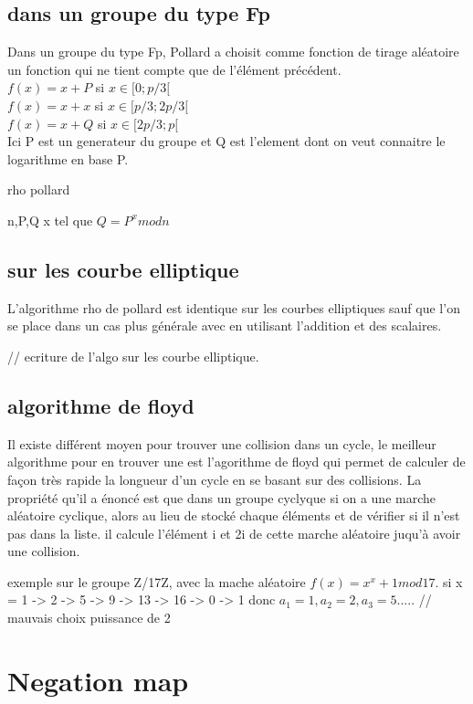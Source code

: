 \documentclass[a4paper,10pt]{report}
\begin{document}
\section{dans un groupe du type Fp}
Dans un groupe du type Fp, Pollard a choisit comme fonction de tirage aléatoire un fonction qui ne tient compte que de l'élément précédent.\\
$ f(x) = x+P$ si $x \in [0;p/3[$\\
$ f(x) = x+x$ si $x \in [p/3;2p/3[$\\
$ f(x) = x+Q$ si $x \in [2p/3;p[$\\
Ici P est un generateur du groupe et Q est l'element dont on veut connaitre le logarithme en base P.
{
\begin{algorithm}
\caption{rho pollard}
\begin{algorithmic}
 \REQUIRE n,P,Q
 \ENSURE x tel que $Q = P^x mod n$
\end{algorithmic}
\end{algorithm}


\section{sur les courbe elliptique}
L'algorithme rho de pollard est identique sur les courbes elliptiques sauf que l'on se place dans un cas plus générale
avec en utilisant l'addition et des scalaires.

// ecriture de l'algo sur les courbe elliptique.

\section{algorithme de floyd}
Il existe différent moyen pour trouver une collision dans un cycle, le meilleur algorithme pour en trouver
une est l'agorithme de floyd qui permet de calculer de façon très rapide la longueur d'un cycle en se basant sur des collisions.
La propriété qu'il a énoncé est que dans un groupe cyclyque si on a une marche aléatoire cyclique, alors au lieu de stocké chaque 
éléments et de vérifier si il n'est pas dans la liste. il calcule l'élément i et 2i de cette marche aléatoire juqu'à avoir une 
collision.

exemple sur le groupe Z/17Z, avec la mache aléatoire $f(x) = x^x + 1 mod 17$.
si x = 1 -> 2 -> 5 -> 9 -> 13 -> 16 -> 0 -> 1
donc $a_1 = 1, a_2 = 2, a_3 = 5 .....$
// mauvais choix puissance de 2


\chapter{Negation map}
}
\end{document}
